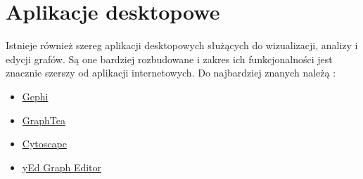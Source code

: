 \section{Aplikacje desktopowe}

Istnieje również szereg aplikacji desktopowych służących do wizualizacji, analizy i edycji grafów. Są one bardziej rozbudowane i zakres ich funkcjonalności jest znacznie szerszy od aplikacji internetowych. Do najbardziej znanych należą \cite{mathex-desktop}:

\begin{itemize}
\setlength\itemsep{0em}
\item \href{https://gephi.org/}{Gephi}
\item \href{http://www.graphtheorysoftware.com/}{GraphTea}
\item \href{http://www.cytoscape.org/}{Cytoscape}
\item \href{https://www.yworks.com}{yEd Graph Editor}
\end{itemize}